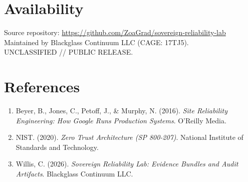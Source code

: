 \documentclass[10pt,twocolumn,letterpaper]{article}
\begin{document}
\section*{Availability}
\noindent Source repository: \url{https://github.com/ZoaGrad/sovereign-reliability-lab}\\
Maintained by Blackglass Continuum LLC (CAGE: 17TJ5).\\
UNCLASSIFIED // PUBLIC RELEASE.

\section*{References}
\begin{enumerate}
\item Beyer, B., Jones, C., Petoff, J., \& Murphy, N. (2016). \textit{Site Reliability Engineering: How Google Runs Production Systems}. O'Reilly Media.
\item NIST. (2020). \textit{Zero Trust Architecture (SP 800-207)}. National Institute of Standards and Technology.
\item Willis, C. (2026). \textit{Sovereign Reliability Lab: Evidence Bundles and Audit Artifacts}. Blackglass Continuum LLC.
\end{enumerate}
\end{document}
